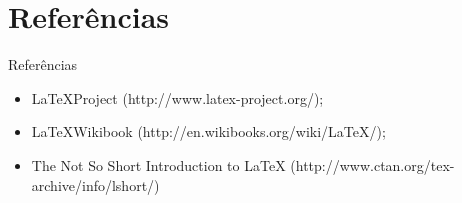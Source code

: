 \section{Refer\^encias}

\begin{frame}
\begin{block}{Refer\^encias}
\begin{itemize}
\item \LaTeX Project (http://www.latex-project.org/);
\item \LaTeX Wikibook (http://en.wikibooks.org/wiki/LaTeX/);
\item The Not So Short Introduction to LaTeX (http://www.ctan.org/tex-archive/info/lshort/)
\end{itemize}
\end{block}
\end{frame}
